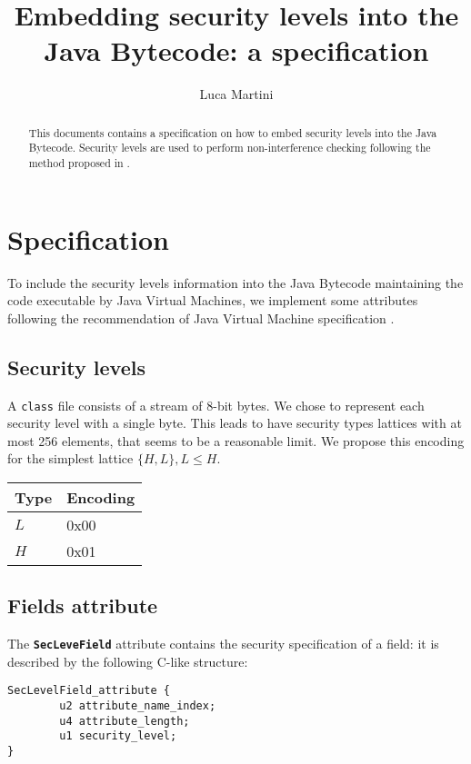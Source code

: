 \documentclass [a4paper,twoside]{article}
\begin{document}

\def\ipd{\textsf{ipd}}
\def\pd{\textsf{pd}}
\def\END{\textsf{End}}

\title{Embedding security levels into the Java Bytecode: a specification}

\author{Luca Martini}
\maketitle


\begin{abstract}
\noindent
This documents contains a specification on how to embed security
levels into the Java Bytecode. Security levels are used to perform
non-interference checking following the method proposed in
\cite{BartheRezk}.
\end{abstract}

\tableofcontents
\newpage

\section{Specification}
To include the security levels information into the Java Bytecode
maintaining the code executable by Java Virtual Machines, we implement
some attributes following the recommendation of Java Virtual Machine
specification \cite[\S4.7]{VMSPEC2}.


\subsection{Security levels}\label{sec:lev}
A \texttt{class} file consists of a stream of 8-bit bytes. We chose to
represent each security level with a single byte. This leads to have
security types lattices with at most 256 elements, that seems to
be a reasonable limit. We propose this encoding for the simplest
lattice $\{H,L\}, L\leq H$.

\begin{center}
\begin{tabular}{|ll|}\hline
\textbf{Type}&\textbf{Encoding}\\\hline\hline
$L$ & 0x00\\
$H$ & 0x01\\\hline
\end{tabular}
\end{center}

\subsection{Fields attribute}
The \textbf{\texttt{SecLeveField}} attribute contains the security
specification of a field: it is described by the following C-like
structure:
\lstset{language=c, basicstyle=\bfseries\ttfamily}
\begin{lstlisting}[frame=tb]
SecLevelField_attribute {
        u2 attribute_name_index;
        u4 attribute_length;
        u1 security_level;
}
\end{lstlisting}
\end{document}
